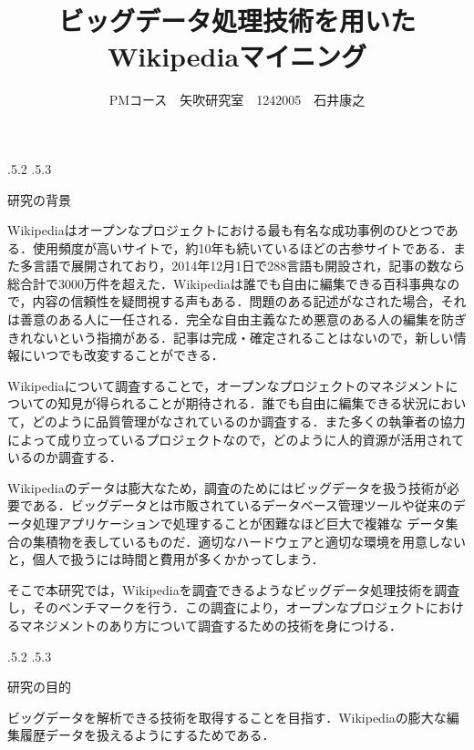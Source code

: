 \documentclass[uplatex]{jsarticle}
\title{\vspace{-14mm}ビッグデータ処理技術を用いたWikipediaマイニング}
\author{PMコース　矢吹研究室　1242005　石井康之}
\date{}%
\makeatletter
\renewcommand{\section}{%
    \if@slide\clearpage\fi
    \@startsection{section}{1}{\z@}%
    {\Cvs \@plus.5\Cdp \@minus.2\Cdp}%
    {.5\Cvs \@plus.3\Cdp}%
    {\normalfont\raggedright}}
\makeatother
\begin{document}
\maketitle





\section{研究の背景}

Wikipediaはオープンなプロジェクトにおける最も有名な成功事例のひとつである\cite{test1}．使用頻度が高いサイトで，約10年も続いているほどの古参サイトである．また多言語で展開されており，2014年12月1日で288言語も開設され，記事の数なら総合計で3000万件を超えた\cite{test107}．Wikipediaは誰でも自由に編集できる百科事典なので，内容の信頼性を疑問視する声もある．問題のある記述がなされた場合，それは善意のある人に一任される．完全な自由主義なため悪意のある人の編集を防ぎきれないという指摘がある．記事は完成・確定されることはないので，新しい情報にいつでも改変することができる．

Wikipediaについて調査することで，オープンなプロジェクトのマネジメントについての知見が得られることが期待される．誰でも自由に編集できる状況において，どのように品質管理がなされているのか調査する．また多くの執筆者の協力によって成り立っているプロジェクトなので，どのように人的資源が活用されているのか調査する．

Wikipediaのデータは膨大なため，調査のためにはビッグデータを扱う技術が必要である．ビッグデータとは市販されているデータベース管理ツールや従来のデータ処理アプリケーションで処理することが困難なほど巨大で複雑な データ集合の集積物を表しているものだ\cite{test106}．適切なハードウェアと適切な環境を用意しないと，個人で扱うには時間と費用が多くかかってしまう．

そこで本研究では，Wikipediaを調査できるようなビッグデータ処理技術を調査し，そのベンチマークを行う．この調査により，オープンなプロジェクトにおけるマネジメントのあり方について調査するための技術を身につける．





\section{研究の目的}

ビッグデータを解析できる技術を取得することを目指す．Wikipediaの膨大な編集履歴データを扱えるようにするためである．
\end{document}
